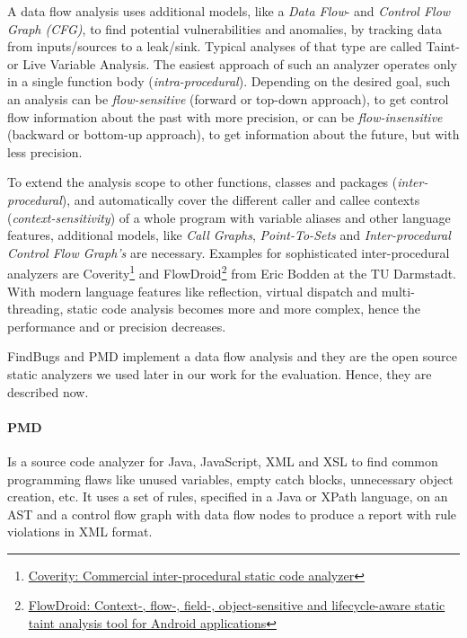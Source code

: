 \documentclass[conference]{IEEEtran}
\begin{document}
A data flow analysis uses additional models, like a \textit{Data Flow}- and \textit{Control Flow Graph (CFG)}, to find potential vulnerabilities and anomalies, by tracking data from inputs/sources to a leak/sink.
Typical analyses of that type are called Taint- or Live Variable Analysis.
The easiest approach of such an analyzer operates only in a single function body (\textit{intra-procedural}).
Depending on the desired goal, such an analysis can be \textit{flow-sensitive} (forward or top-down approach), to get control flow information about the past with more precision, or can be \textit{flow-insensitive} (backward or bottom-up approach), to get information about the future, but with less precision.


To extend the analysis scope to other functions, classes and packages (\textit{inter-procedural}), and automatically cover the different caller and callee contexts (\textit{context-sensitivity}) of a whole program with variable aliases and other language features, additional models, like \textit{Call Graphs}, \textit{Point-To-Sets} and \textit{Inter-procedural Control Flow Graph's} are necessary.
Examples for sophisticated inter-procedural analyzers are Coverity\footnote{\href{https://www.coverity.com}{Coverity: Commercial inter-procedural static code analyzer}} and FlowDroid\footnote{\href{http://sseblog.ec-spride.de/tools/flowdroid}{FlowDroid: Context-, flow-, field-, object-sensitive and lifecycle-aware static taint analysis tool for Android applications}} from Eric Bodden at the TU Darmstadt.
With modern language features like reflection, virtual dispatch and multi-threading, static code analysis becomes more and more complex, hence the performance and or precision decreases.


FindBugs and PMD implement a data flow analysis and they are the open source static analyzers we used later in our work for the evaluation.
Hence, they are described now.

\paragraph{PMD}
Is a source code analyzer for Java, JavaScript, XML and XSL to find common programming flaws like unused variables, empty catch blocks, unnecessary object creation, etc.
It uses a set of rules, specified in a Java or XPath language, on an AST and a control flow graph with data flow nodes to produce a report with rule violations in XML format.
\end{document}
